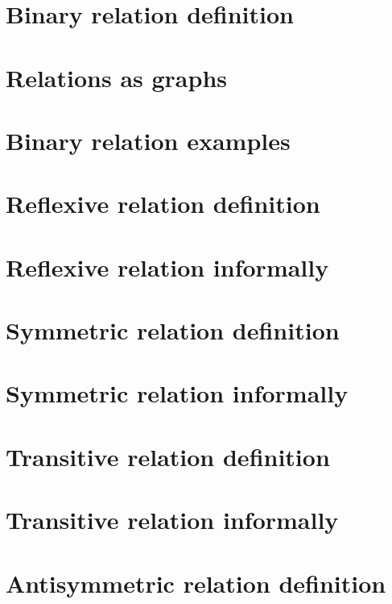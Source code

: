 \section*{Binary relation definition}

\vfill
\section*{Relations as graphs}

\vfill
\section*{Binary relation examples}

\vfill
\section*{Reflexive relation definition}

\vfill
\section*{Reflexive relation informally}

\vfill
\section*{Symmetric relation definition}

\vfill
\section*{Symmetric relation informally}

\vfill
\section*{Transitive relation definition}

\vfill
\section*{Transitive relation informally}

\vfill
\section*{Antisymmetric relation definition}

\vfill
